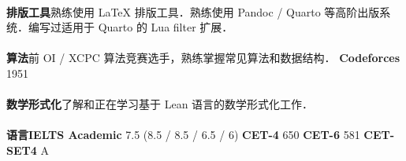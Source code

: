 \documentclass{resume}
\begin{document}
\paragraph{}{\textbf{排版工具}\quad 熟练使用 LaTeX 排版工具．熟练使用 Pandoc / Quarto 等高阶出版系统．编写过适用于 Quarto 的 Lua filter 扩展．}
\paragraph{}{\textbf{算法}\quad 前 OI / XCPC 算法竞赛选手，熟练掌握常见算法和数据结构． \quad \textbf{Codeforces} 1951}
\paragraph{}{\textbf{数学形式化}\quad 了解和正在学习基于 Lean 语言的数学形式化工作．}
\paragraph{}{\textbf{语言}\quad \textbf{IELTS Academic} 7.5 (8.5 / 8.5 / 6.5 / 6) \quad \textbf{CET-4} 650 \quad \textbf{CET-6} 581 \quad \textbf{CET-SET4} A}

\sepspace
\end{document}
